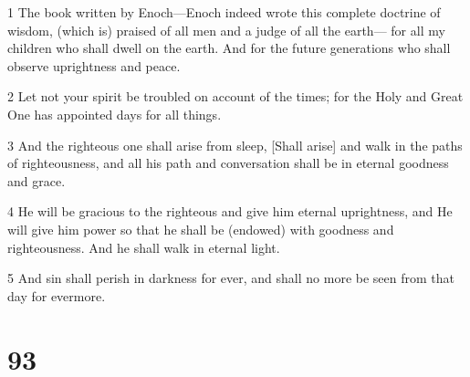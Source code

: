 \par 1 The book written by Enoch—Enoch indeed wrote this complete doctrine of wisdom, (which is) praised of all men and a judge of all the earth— for all my children who shall dwell on the earth. And for the future generations who shall observe uprightness and peace.
\par 2 Let not your spirit be troubled on account of the times; for the Holy and Great One has appointed days for all things.
\par 3 And the righteous one shall arise from sleep, [Shall arise] and walk in the paths of righteousness, and all his path and conversation shall be in eternal goodness and grace.
\par 4 He will be gracious to the righteous and give him eternal uprightness, and He will give him power so that he shall be (endowed) with goodness and righteousness. And he shall walk in eternal light.
\par 5 And sin shall perish in darkness for ever, and shall no more be seen from that day for evermore.

\chapter{93}

